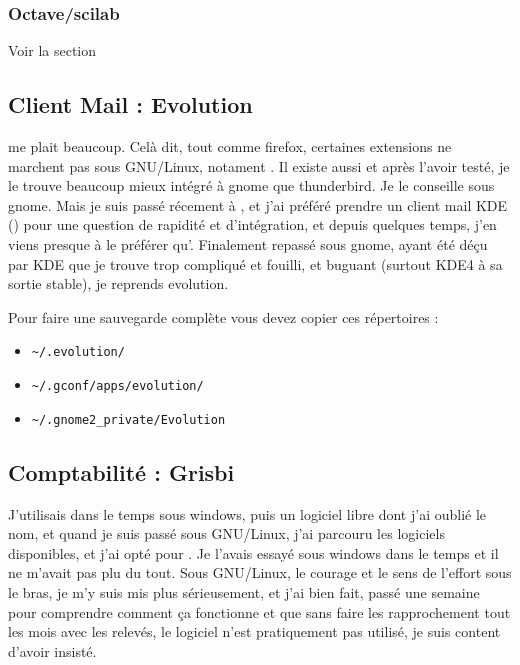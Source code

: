 \documentclass[a4paper,twoside]{article}
\begin{document}
\subsubsection{Octave/scilab}
Voir la section 

\subsection{Client Mail : Evolution}
 me plait beaucoup. Celà dit, tout comme firefox, certaines extensions ne marchent pas sous GNU/Linux, notament . Il existe aussi  et après l'avoir testé, je le trouve beaucoup mieux intégré à gnome que thunderbird. Je le conseille sous gnome. Mais je suis passé récement à , et j'ai préféré prendre un client mail KDE () pour une question de rapidité et d'intégration, et depuis quelques temps, j'en viens presque à le préférer qu'. Finalement repassé sous gnome, ayant été déçu par KDE que je trouve trop compliqué et fouilli, et buguant (surtout KDE4 à sa sortie stable), je reprends evolution.

\begin{remarque}
Pour faire une sauvegarde complète vous devez copier ces répertoires :
\begin{itemize}
\item  \verb|~/.evolution/|
\item  \verb|~/.gconf/apps/evolution/|
\item  \verb|~/.gnome2_private/Evolution|
\end{itemize}
\end{remarque}


\subsection{Comptabilité : Grisbi}
J'utilisais  dans le temps sous windows, puis un logiciel libre dont j'ai oublié le nom, et quand je suis passé sous GNU/Linux, j'ai parcouru les logiciels disponibles, et j'ai opté pour . Je l'avais essayé sous windows dans le temps et il ne m'avait pas plu du tout. Sous GNU/Linux, le courage et le sens de l'effort sous le bras, je m'y suis mis plus sérieusement, et j'ai bien fait, passé une semaine pour comprendre comment ça fonctionne et que sans faire les rapprochement tout les mois avec les relevés, le logiciel n'est pratiquement pas utilisé, je suis content d'avoir insisté.
\end{document}
